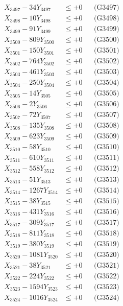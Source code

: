 \documentclass[a4paper,10pt]{article}
\begin{document}
{\begin{align}
X_{3497} - 34Y_{3497} &\leq +0 && \text{(G3497)} \\
X_{3498} - 10Y_{3498} &\leq +0 && \text{(G3498)} \\
X_{3499} - 91Y_{3499} &\leq +0 && \text{(G3499)} \\
X_{3500} - 809Y_{3500} &\leq +0 && \text{(G3500)} \\
\allowbreak
X_{3501} - 150Y_{3501} &\leq +0 && \text{(G3501)} \\
X_{3502} - 764Y_{3502} &\leq +0 && \text{(G3502)} \\
X_{3503} - 461Y_{3503} &\leq +0 && \text{(G3503)} \\
X_{3504} - 250Y_{3504} &\leq +0 && \text{(G3504)} \\
X_{3505} - 14Y_{3505} &\leq +0 && \text{(G3505)} \\
X_{3506} - 2Y_{3506} &\leq +0 && \text{(G3506)} \\
X_{3507} - 72Y_{3507} &\leq +0 && \text{(G3507)} \\
X_{3508} - 135Y_{3508} &\leq +0 && \text{(G3508)} \\
X_{3509} - 623Y_{3509} &\leq +0 && \text{(G3509)} \\
X_{3510} - 58Y_{3510} &\leq +0 && \text{(G3510)} \\
\allowbreak
X_{3511} - 610Y_{3511} &\leq +0 && \text{(G3511)} \\
X_{3512} - 558Y_{3512} &\leq +0 && \text{(G3512)} \\
X_{3513} - 51Y_{3513} &\leq +0 && \text{(G3513)} \\
X_{3514} - 1267Y_{3514} &\leq +0 && \text{(G3514)} \\
X_{3515} - 38Y_{3515} &\leq +0 && \text{(G3515)} \\
X_{3516} - 431Y_{3516} &\leq +0 && \text{(G3516)} \\
X_{3517} - 309Y_{3517} &\leq +0 && \text{(G3517)} \\
X_{3518} - 811Y_{3518} &\leq +0 && \text{(G3518)} \\
X_{3519} - 380Y_{3519} &\leq +0 && \text{(G3519)} \\
X_{3520} - 1081Y_{3520} &\leq +0 && \text{(G3520)} \\
\allowbreak
X_{3521} - 38Y_{3521} &\leq +0 && \text{(G3521)} \\
X_{3522} - 224Y_{3522} &\leq +0 && \text{(G3522)} \\
X_{3523} - 1594Y_{3523} &\leq +0 && \text{(G3523)} \\
X_{3524} - 1016Y_{3524} &\leq +0 && \text{(G3524)} \\

\end{align}}
\end{document}
